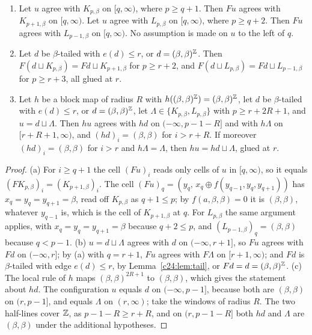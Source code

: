 \begin{lemma}[gluing]\label{c24:lem:glue}
\begin{enumerate}
\item[(a)] Let $u$ agree with $K_{p,\beta}$ on $[q,\infty)$, where $p\ge q+1$. Then $Fu$ agrees with $K_{p+1,\beta}$ on $[q,\infty)$. Let $u$ agree with $L_{p,\beta}$ on $[q,\infty)$, where $p\ge q+2$. Then $Fu$ agrees with $L_{p-1,\beta}$ on $[q,\infty)$. No assumption is made on $u$ to the left of $q$.
\item[(b)] Let $d$ be $\beta$-tailed with $e(d)\le r$, or $d=(\beta,\beta)^{\mathbb{Z}}$. Then $F(d\sqcup K_{p,\beta})=Fd\sqcup K_{p+1,\beta}$ for $p\ge r+2$, and $F(d\sqcup L_{p,\beta})=Fd\sqcup L_{p-1,\beta}$ for $p\ge r+3$, all glued at $r$.
\item[(c)] Let $h$ be a block map of radius $R$ with $h((\beta,\beta)^{\mathbb{Z}})=(\beta,\beta)^{\mathbb{Z}}$, let $d$ be $\beta$-tailed with $e(d)\le r$, or $d=(\beta,\beta)^{\mathbb{Z}}$, let $\Lambda\in\{K_{p,\beta},L_{p,\beta}\}$ with $p\ge r+2R+1$, and $u=d\sqcup\Lambda$. Then $hu$ agrees with $hd$ on $(-\infty,p-1-R]$ and with $h\Lambda$ on $[r+R+1,\infty)$, and $(hd)_i=(\beta,\beta)$ for $i>r+R$. If moreover $(hd)_i=(\beta,\beta)$ for $i>r$ and $h\Lambda=\Lambda$, then $hu=hd\sqcup\Lambda$, glued at $r$.
\end{enumerate}
\end{lemma}

\begin{proof}
(a) For $i\ge q+1$ the cell $(Fu)_i$ reads only cells of $u$ in $[q,\infty)$, so it equals $(FK_{p,\beta})_i=(K_{p+1,\beta})_i$. The cell $(Fu)_q=(y_q,\,x_q\oplus f(y_{q-1},y_q,y_{q+1}))$ has $x_q=y_q=y_{q+1}=\beta$, read off $K_{p,\beta}$ as $q+1\le p$; by $f(a,\beta,\beta)=0$ it is $(\beta,\beta)$, whatever $y_{q-1}$ is, which is the cell of $K_{p+1,\beta}$ at $q$. For $L_{p,\beta}$ the same argument applies, with $x_q=y_q=y_{q+1}=\beta$ because $q+2\le p$, and $(L_{p-1,\beta})_q=(\beta,\beta)$ because $q<p-1$. (b) $u=d\sqcup\Lambda$ agrees with $d$ on $(-\infty,r+1]$, so $Fu$ agrees with $Fd$ on $(-\infty,r]$; by (a) with $q=r+1$, $Fu$ agrees with $F\Lambda$ on $[r+1,\infty)$; and $Fd$ is $\beta$-tailed with edge $e(d)\le r$, by Lemma~\ref{c24:lem:tail}, or $Fd=d=(\beta,\beta)^{\mathbb{Z}}$. (c) The local rule of $h$ maps $(\beta,\beta)^{2R+1}$ to $(\beta,\beta)$, which gives the statement about $hd$. The configuration $u$ equals $d$ on $(-\infty,p-1]$, because both are $(\beta,\beta)$ on $(r,p-1]$, and equals $\Lambda$ on $(r,\infty)$; take the windows of radius $R$. The two half-lines cover $\mathbb{Z}$, as $p-1-R\ge r+R$, and on $(r,p-1-R]$ both $hd$ and $\Lambda$ are $(\beta,\beta)$ under the additional hypotheses.
\end{proof}

